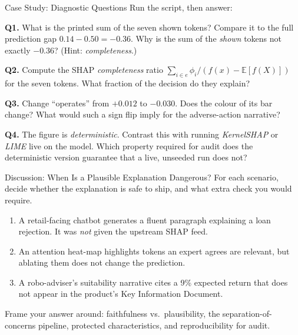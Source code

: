 \documentclass[9pt,t]{beamer}
\begin{document}
\begin{frame}{Case Study: Diagnostic Questions}
Run the script, then answer:

\medskip
\textbf{Q1.} What is the printed sum of the seven shown tokens? Compare it to the
full prediction gap $0.14 - 0.50 = -0.36$. Why is the sum of the \emph{shown}
tokens not exactly $-0.36$? (Hint: \emph{completeness}.)

\medskip
\textbf{Q2.} Compute the SHAP \emph{completeness} ratio
$\sum_{i\in e} \phi_i / (f(x)-\mathbb{E}[f(X)])$ for the seven tokens. What
fraction of the decision do they explain?

\medskip
\textbf{Q3.} Change ``operates'' from $+0.012$ to $-0.030$. Does the colour of its
bar change? What would such a sign flip imply for the adverse-action narrative?

\medskip
\textbf{Q4.} The figure is \emph{deterministic}. Contrast this with running
\emph{KernelSHAP} or \emph{LIME} live on the model. Which property required for
audit does the deterministic version guarantee that a live, unseeded run does not?
\end{frame}

\begin{frame}{Discussion: When Is a Plausible Explanation Dangerous?}
For each scenario, decide whether the explanation is safe to ship, and what extra
check you would require.

\medskip
\begin{enumerate}
  \item A retail-facing chatbot generates a fluent paragraph explaining a loan
        rejection. It was \emph{not} given the upstream SHAP feed.
  \item An attention heat-map highlights tokens an expert agrees are relevant, but
        ablating them does not change the prediction.
  \item A robo-adviser's suitability narrative cites a 9\% expected return that does
        not appear in the product's Key Information Document.
\end{enumerate}

\medskip
\begin{block}{Frame your answer around:}
faithfulness vs.\ plausibility, the separation-of-concerns pipeline, protected
characteristics, and reproducibility for audit.
\end{block}
\end{frame}
\end{document}
